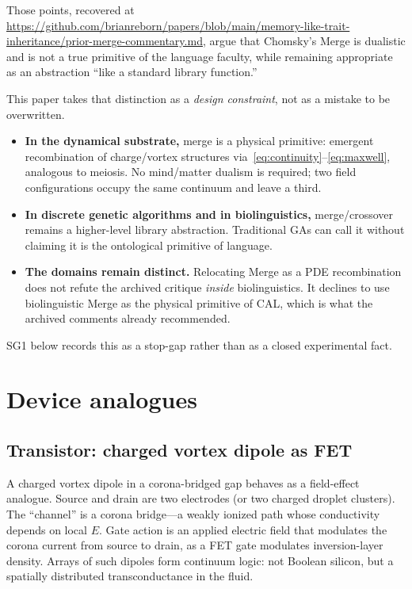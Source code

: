 \documentclass[11pt,a4paper]{article}
\begin{document}
Those points, recovered at \url{https://github.com/brianreborn/papers/blob/main/memory-like-trait-inheritance/prior-merge-commentary.md}, argue that Chomsky's Merge is dualistic and is not a true primitive of the language faculty, while remaining appropriate as an abstraction ``like a standard library function.''

This paper takes that distinction as a \emph{design constraint}, not as a mistake to be overwritten.

\begin{itemize}[leftmargin=1.4em]
\item \textbf{In the dynamical substrate,} merge is a physical primitive: emergent recombination of charge/vortex structures via~\eqref{eq:continuity}--\eqref{eq:maxwell}, analogous to meiosis. No mind/matter dualism is required; two field configurations occupy the same continuum and leave a third.
\item \textbf{In discrete genetic algorithms and in biolinguistics,} merge/crossover remains a higher-level library abstraction. Traditional GAs can call it without claiming it is the ontological primitive of language.
\item \textbf{The domains remain distinct.} Relocating Merge as a PDE recombination does not refute the archived critique \emph{inside} biolinguistics. It declines to use biolinguistic Merge as the physical primitive of CAL, which is what the archived comments already recommended.
\end{itemize}

SG1 below records this as a stop-gap rather than as a closed experimental fact.

\section{Device analogues}
\subsection{Transistor: charged vortex dipole as FET}
A charged vortex dipole in a corona-bridged gap behaves as a field-effect analogue. Source and drain are two electrodes (or two charged droplet clusters). The ``channel'' is a corona bridge---a weakly ionized path whose conductivity depends on local $E$. Gate action is an applied electric field that modulates the corona current from source to drain, as a FET gate modulates inversion-layer density. Arrays of such dipoles form continuum logic: not Boolean silicon, but a spatially distributed transconductance in the fluid.
\end{document}
